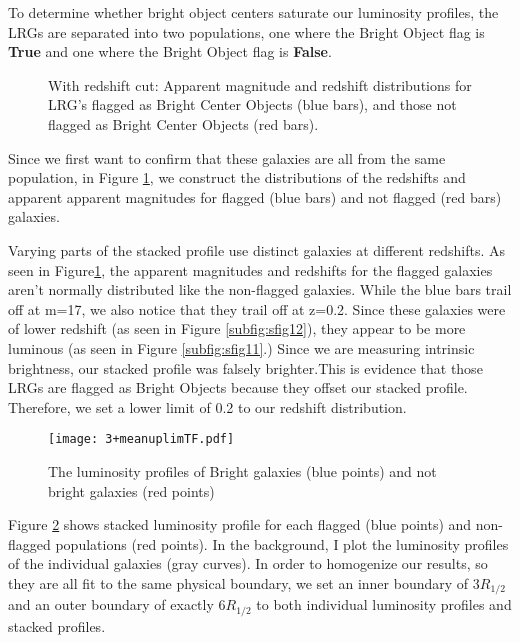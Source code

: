 \documentclass{article}
\begin{document}
To determine whether bright object centers saturate our luminosity profiles, the LRGs are separated into two populations, one where the Bright Object flag is \textbf{True} and one where the Bright Object flag is \textbf{False}.

\begin{figure}[htp]
\hfill
{}
 \caption{With redshift cut: Apparent magnitude and redshift distributions for LRG's flagged as Bright Center Objects (blue bars), and those not flagged as Bright Center Objects (red bars). }
\label{fig:mesha1}
\end{figure}

Since we first want to confirm that these galaxies are all from the same population, in Figure \ref{fig:mesha1}, we construct the distributions of the redshifts and apparent apparent magnitudes for flagged (blue bars) and not flagged (red bars) galaxies.

Varying parts of the stacked profile use distinct galaxies at different redshifts. As seen in Figure\ref{fig:mesha1}, the apparent magnitudes and redshifts for the flagged galaxies aren't normally distributed like the non-flagged galaxies. While the blue bars trail off at m=17, we also notice that they trail off at z=0.2. Since these galaxies were of lower redshift (as seen in Figure \ref{subfig:sfig12}), they appear to be more luminous (as seen in Figure \ref{subfig:sfig11}.) Since we are measuring intrinsic brightness, our stacked profile was falsely brighter.This is evidence that those LRGs are flagged as Bright Objects because they offset our stacked profile. Therefore, we set a lower limit of 0.2 to our redshift distribution.  

\begin{figure}[h!]
\centering
\texttt{[image: 3+meanuplimTF.pdf]}
\caption{The luminosity profiles of Bright galaxies (blue points) and not bright galaxies (red points)}
\label{fig:mesh1}
\end{figure}


Figure \ref{fig:mesh1} shows stacked luminosity profile for each flagged (blue points) and non-flagged populations (red points). In the background, I plot the luminosity profiles of the individual galaxies (gray curves).  In order to homogenize our results, so they are all fit to the same physical boundary, we set an inner boundary of $3R_{1/2}$ and an outer boundary of exactly $6R_{1/2}$ to both individual luminosity profiles and stacked profiles. 
\end{document}
